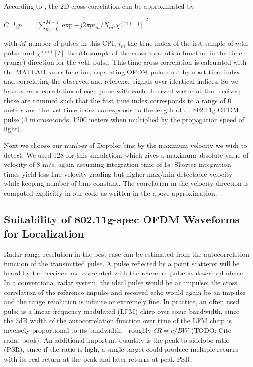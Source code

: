 \documentclass[article,11pt,onecolumn,final]{IEEEtran}
\begin{document}
According to \cite{Colone2012}, the 2D cross-correlation can be approximated by

$ C[l, p] = |\sum\limits_{m=0}^{M-1}\exp{-j2\pi pi_m/N_{int}}\chi^{(m)}[l]|^2 $

with $M$ number of pulses in this CPI, $i_m$ the time index of the irst sample of $m$th pulse, and $\chi^{(m)}[l]$ the $l$th sample of the cross-correlation function in the time (range) direction for the $m$th pulse. This time cross correlation is calculated with the MATLAB xcorr function, separating OFDM pulses out by start time index and correlating the observed and reference signals over identical indices. So we have a cross-correlation of each pulse with each observed vector at the receiver; these are trimmed such that the first time index corresponds to a range of 0 meters and the last time index corresponds to the length of an 802.11g OFDM pulse (4 microseconds, 1200 meters when multiplied by the propagation speed of light).

Next we choose our number of Doppler bins by the maximum velocity we wish to detect. We used 128 for this simulation, which gives a maximum absolute value of velocity of 8 m/s, again assuming integration time of 1s. Shorter integration times yield less fine velocity grading but higher max/min detectable velocity while keeping number of bins constant. The correlation in the velocity direction is computed explicitly in our code as written in the above approximation.

\subsection{Suitability of 802.11g-spec OFDM Waveforms for Localization}
Radar range resolution in the best case can be estimated from the autocorrelation function of the transmitted pulse. A pulse reflected by a point scatterer will be heard by the receiver and correlated with the reference pulse as described above. In a conventional radar system, the ideal pulse would be an impulse; the cross correlation of the reference impulse and received echo would again be an impulse and the range resolution is infinite or extremely fine. In practice, an often used pulse is a linear frequency modulated (LFM) chirp over some bandwidth, since the 3dB width of the autocorrelation function over time of the LFM chirp is inversely proportional to its bandwidth -- roughly $\delta R = c / BW$ (TODO: Cite radar book). An additional important quantity is the peak-to-sidelobe ratio (PSR), since if the ratio is high, a single target could produce multiple returns with its real return at the peak and later returns at peak-PSR.
\end{document}
